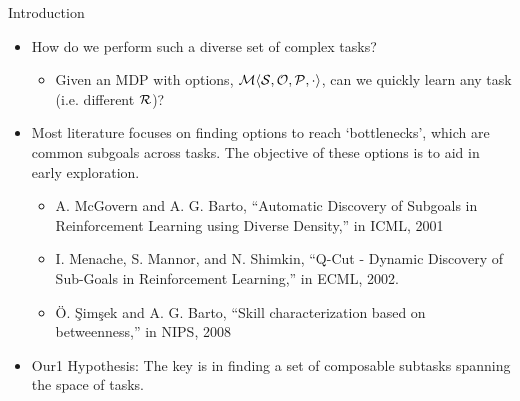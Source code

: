 \begin{block}{Introduction}
    \begin{itemize}
        \item How do we perform such a diverse set of complex tasks?
            \begin{itemize}              
                \item Given an MDP with options, $\mathcal{M}
                    \langle \mathcal{S},\mathcal{O},\mathcal{P},\cdot \rangle$, can we
                    quickly learn any task (i.e. different $\mathcal{R}$)?
            \end{itemize}
        \item Most literature focuses on finding options to reach `bottlenecks',
            which are common subgoals across tasks. The objective of these
            options is to aid in early exploration.
            \begin{itemize}              
                \item A. McGovern and A. G. Barto, ``Automatic Discovery of
                    Subgoals in Reinforcement Learning using Diverse Density,''
                    in ICML, 2001
                \item I. Menache, S. Mannor, and N. Shimkin, ``Q-Cut - Dynamic
                    Discovery of Sub-Goals in Reinforcement Learning,'' in ECML,
                    2002. 
                \item \"{O}. \c{S}im\c{s}ek and A. G. Barto, ``Skill
                    characterization based on betweenness,'' in NIPS, 2008 
            \end{itemize}              
        \item Our1 Hypothesis: The key is in finding a set of composable subtasks
            spanning the space of tasks.
    \end{itemize}              
\end{block}

